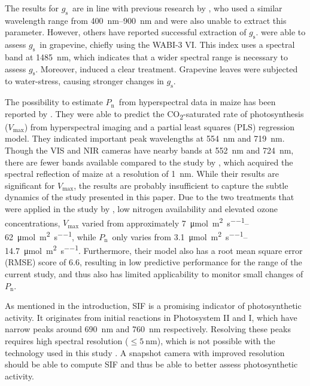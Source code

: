 \documentclass[10pt,authoryear,a4paper]{elsarticle}
\newcommand{\Cond}{$g_\text{s}$}
\newcommand{\Photo}{$P_\text{n}$}
\begin{document}
    The results for \Cond\ are in line with previous research by \citet{zarco-tejadaRelationships2013}, who used a similar wavelength range from \SIrange{400}{900}{\nano\metre} and were also unable to extract this parameter. However, others have reported successful extraction of \Cond. \citet{rapaportCombining2015} were able to assess \Cond\ in grapevine, chiefly using the WABI-3 VI. This index uses a spectral band at \SI{1485}{\nano\metre}, which indicates that a wider spectral range is necessary to assess \Cond. Moreover, \citet{rapaportCombining2015} induced a clear treatment. Grapevine leaves were subjected to water-stress, causing stronger changes in \Cond.
    
    The possibility to estimate \Photo\ from hyperspectral data in maize has been reported by \citet{yendrekHighThroughput2017}. They were able to predict the CO\textsubscript{2}-saturated rate of photosynthesis ($V_\text{max}$) from hyperspectral imaging and a partial least squares (PLS) regression model. They indicated important peak wavelengths at \SI{554}{\nano\metre} and \SI{719}{\nano\metre}. Though the VIS and NIR cameras have nearby bands at \SI{552}{\nano\metre} and \SI{724}{\nano\metre}, there are fewer bands available compared to the study by \citet{yendrekHighThroughput2017}, which acquired the spectral reflection of maize at a resolution of \SI{1}{\nano\metre}. While their results are significant for $V_\text{max}$, the results are probably insufficient to capture the subtle dynamics of the study presented in this paper. Due to the two treatments that were applied in the study by \citet{yendrekHighThroughput2017}, low nitrogen availability and elevated ozone concentrations, $V_\text{max}$ varied from approximately \SIrange{7}{62}{\micro\mole\per\square\metre\per\second}, while \Photo\ only varies from \SIrange{3.1}{14.7}{\micro\mole\per\square\metre\per\second}. Furthermore, their model also has a root mean square error (RMSE) score of 6.6, resulting in low predictive performance for the range of the current study, and thus also has limited applicability to monitor small changes of \Photo.
    
    As mentioned in the introduction, SIF is a promising indicator of photosynthetic activity. It originates from initial reactions in Photosystem II and I, which have narrow peaks around \SI{690}{\nano\metre} and \SI{760}{\nano\metre} respectively. Resolving these peaks requires high spectral resolution ($\le\SI{5}{\nano\metre}$), which is not possible with the technology used in this study \citep{bandopadhyayReview2020}. A snapshot camera with improved resolution should be able to compute SIF and thus be able to better assess photosynthetic activity.
    
\end{document}

